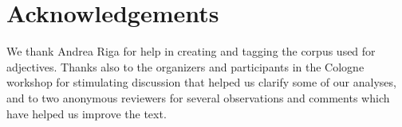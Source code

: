 \documentclass[output=paper,colorlinks,citecolor=brown]{langscibook}
\begin{document}
\section*{Acknowledgements}
We thank Andrea Riga for help in creating and tagging the corpus used for adjectives. Thanks also to the organizers and participants in the Cologne workshop for stimulating discussion that helped us clarify some of our analyses, and to two anonymous reviewers for several observations and comments which have helped us improve the text.



{\sloppy\printbibliography[heading=subbibliography,notkeyword=this]}
\end{document}

